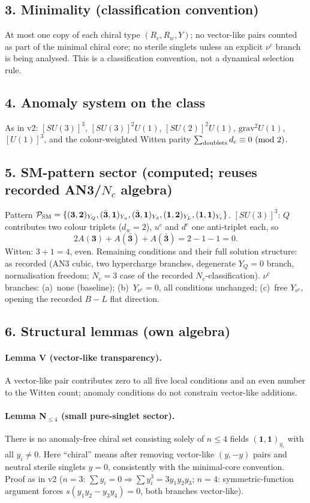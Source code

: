 \subsection*{3. Minimality (classification convention)}
At most one copy of each chiral type $(R_c,R_w,Y)$; no vector-like
pairs counted as part of the minimal chiral core; no sterile
singlets unless an explicit $\nu^c$ branch is being analysed.
This is a classification convention, not a dynamical selection
rule.

\subsection*{4. Anomaly system on the class}
As in v2: $[SU(3)]^3$, $[SU(3)]^2U(1)$, $[SU(2)]^2U(1)$,
$\mathrm{grav}^2U(1)$, $[U(1)]^3$, and the colour-weighted Witten
parity $\sum_{\rm doublets} d_c\equiv0\ (\mathrm{mod}\ 2)$.

\subsection*{5. SM-pattern sector (computed; reuses recorded
AN3/$N_c$ algebra)}
Pattern $\mathcal P_{\rm SM}=
\{(\mathbf 3,\mathbf 2)_{Y_Q},(\bar{\mathbf 3},\mathbf 1)_{Y_u},
(\bar{\mathbf 3},\mathbf 1)_{Y_d},(\mathbf 1,\mathbf 2)_{Y_L},
(\mathbf 1,\mathbf 1)_{Y_e}\}$.
$[SU(3)]^3$: $Q$ contributes two colour triplets ($d_w=2$),
$u^c$ and $d^c$ one anti-triplet each, so
\[
2A(\mathbf 3)+A(\bar{\mathbf 3})+A(\bar{\mathbf 3})=2-1-1=0 .
\]
Witten: $3+1=4$, even.
Remaining conditions and their full solution structure: as
recorded (AN3 cubic, two hypercharge branches, degenerate
$Y_Q=0$ branch, normalisation freedom; $N_c=3$ case of the
recorded $N_c$-classification).
$\nu^c$ branches: (a)~none (baseline); (b)~$Y_{\nu^c}=0$, all
conditions unchanged; (c)~free $Y_{\nu^c}$, opening the recorded
$B-L$ flat direction.

\subsection*{6. Structural lemmas (own algebra)}
\paragraph{Lemma V (vector-like transparency).}
A vector-like pair contributes zero to all five local conditions
and an even number to the Witten count; anomaly conditions do not
constrain vector-like additions.
\paragraph{Lemma N$_{\le4}$ (small pure-singlet sector).}
There is no anomaly-free chiral set consisting solely of $n\le4$
fields $(\mathbf 1,\mathbf 1)_{y_i}$ with all $y_i\neq0$.
Here ``chiral'' means after removing vector-like $(y,-y)$ pairs
and neutral sterile singlets $y=0$, consistently with the
minimal-core convention.
Proof as in v2 ($n=3$: $\sum y_i=0\Rightarrow\sum y_i^3=3y_1y_2y_3$;
$n=4$: symmetric-function argument forces $s(y_1y_2-y_3y_4)=0$,
both branches vector-like).
